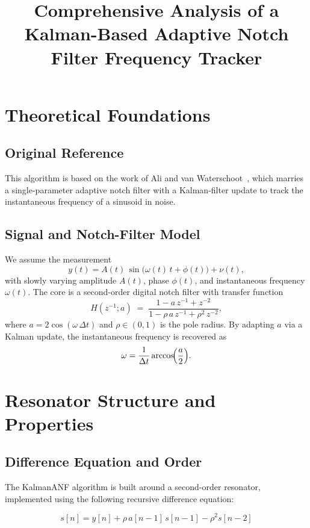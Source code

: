 \documentclass{article}
\title{Comprehensive Analysis of a Kalman-Based Adaptive Notch Filter Frequency Tracker}
\author{}
\date{}
\begin{document}
\maketitle

\section{Theoretical Foundations}

\subsection{Original Reference}
This algorithm is based on the work of  
Ali and van Waterschoot~\cite{AliWaterschoot2023}, which marries a single-parameter adaptive notch filter with a Kalman-filter update to track the instantaneous frequency of a sinusoid in noise.

\subsection{Signal and Notch-Filter Model}
We assume the measurement
\[
y(t) = A(t)\,\sin\bigl(\omega(t)\,t + \phi(t)\bigr) + \nu(t),
\]
with slowly varying amplitude \(A(t)\), phase \(\phi(t)\), and instantaneous frequency \(\omega(t)\).  The core is a second-order digital notch filter with transfer function
\[
H(z^{-1};a) \;=\; \frac{1 - a\,z^{-1} + z^{-2}}{1 - \rho\,a\,z^{-1} + \rho^2\,z^{-2}},
\]
where \(a = 2\cos(\omega\,\Delta t)\) and \(\rho\in(0,1)\) is the pole radius.  By adapting \(a\) via a Kalman update, the instantaneous frequency is recovered as
\[
\omega = \frac{1}{\Delta t}\arccos\!\Bigl(\frac{a}{2}\Bigr).
\]

\section{Resonator Structure and Properties}

\subsection{Difference Equation and Order}

The KalmanANF algorithm is built around a second-order resonator, implemented using the following recursive difference equation:

\begin{equation}
s[n] = y[n] + \rho\, a[n-1]\, s[n-1] - \rho^2 s[n-2]
\label{eq:resonator}
\end{equation}
\end{document}
